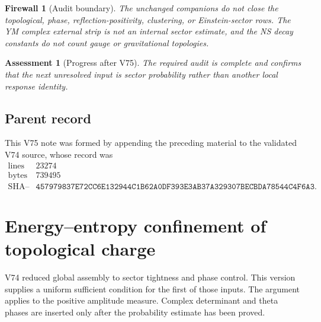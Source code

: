 \documentclass[11pt]{article}
\newtheorem{assessment}[theorem]{Assessment}
\newtheorem{firewall}[theorem]{Firewall}
\begin{document}
\begin{firewall}[Audit boundary]
\label{fire:v11v75-boundary}
The unchanged companions do not close the topological, phase,
reflection-positivity, clustering, or Einstein-sector rows.  The YM
complex external strip is not an internal sector estimate, and the NS
decay constants do not count gauge or gravitational topologies.
\end{firewall}

\begin{assessment}[Progress after V75]
\label{ass:v11v75-status}
The required audit is complete and confirms that the next unresolved
input is sector probability rather than another local response
identity.
\end{assessment}

\subsection{Parent record}

This V75 note was formed by appending the preceding material to the
validated V74 source, whose record was
\[
\begin{array}{c|c}
\text{lines}&23274\\
\text{bytes}&739495\\
\text{SHA--256}&
\texttt{457979837E72CC6E132944C1B62A0DF393E3AB37A329307BECBDA78544C4F6A3}.
\end{array}                                                     \tag{75.2}
\]


\section{Energy--entropy confinement of topological charge}
\label{sec:v11v76}

V74 reduced global assembly to sector tightness and phase control.
This version supplies a uniform sufficient condition for the first
of those inputs.  The argument applies to the positive amplitude
measure.  Complex determinant and theta phases are inserted only
after the probability estimate has been proved.
\end{document}
